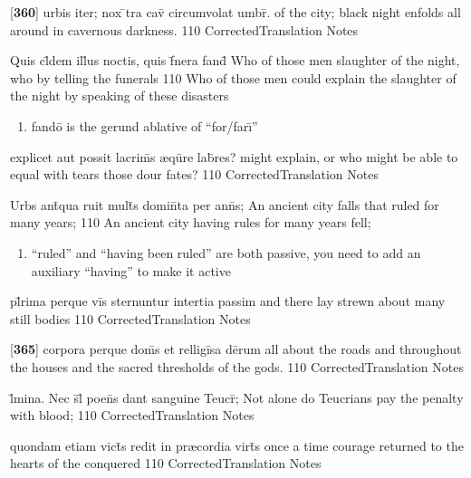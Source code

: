 \latline
  {[\textbf{360}] urbis iter; nox \={}tra cav\={} circumvolat umbr\={}.}
  { of the city; black night enfolds all around in cavernous darkness. }
  {110}
  { CorrectedTranslation }
  { Notes }


\latline
  {Quis cl\={}dem ill\={\macron {\i}}us noctis, quis f\={}nera fand\={}}
  { Who of those men slaughter of the night, who by telling the funerals }
  {110}
  { Who of those men could explain the slaughter of the night by speaking of these disasters }
  { \begin{enumerate}
  	\item fand\={o} is the gerund ablative of ``for/far\={\i}''
  \end{enumerate} }


\latline
  {explicet aut possit lacrim\={\macron {\i}}s {\ae}qu\={}re lab\={}res?}
  { might explain, or who might be able to equal with tears those dour fates? }
  {110}
  { CorrectedTranslation }
  { Notes }


\latline
  {Urbs ant\={\macron {\i}}qua ruit mult\={}s domin\={}ta per ann\={}s;}
  { An ancient city falls that ruled for many years;  }
  {110}
  { An ancient city having rules for many years fell; }
  { \begin{enumerate}
  	\item ``ruled'' and ``having been ruled'' are both passive, you need to add an auxiliary ``having'' to make it active
  \end{enumerate} }


\latline
  {pl\={}rima perque vi\={}s sternuntur intertia passim}
  { and there lay strewn about many still bodies }
  {110}
  { CorrectedTranslation }
  { Notes }


\latline
  {[\textbf{365}] corpora perque dom\={}s et relligi\={}sa de\={}rum}
  { all about the roads and throughout the houses and the sacred thresholds of the gods. }
  {110}
  { CorrectedTranslation }
  { Notes }


\latline
  {l\={\macron {\i}}mina.  Nec s\={}l\={\macron {\i}} poen\={}s dant sanguine Teucr\={\macron {\i}};}
  { Not alone do Teucrians pay the penalty with blood; }
  {110}
  { CorrectedTranslation }
  { Notes }


\latline
  {quondam etiam vict\={\macron {\i}}s redit in pr{\ae}cordia virt\={}s}
  { once a time courage returned to the hearts of the conquered }
  {110}
  { CorrectedTranslation }
  { Notes }


